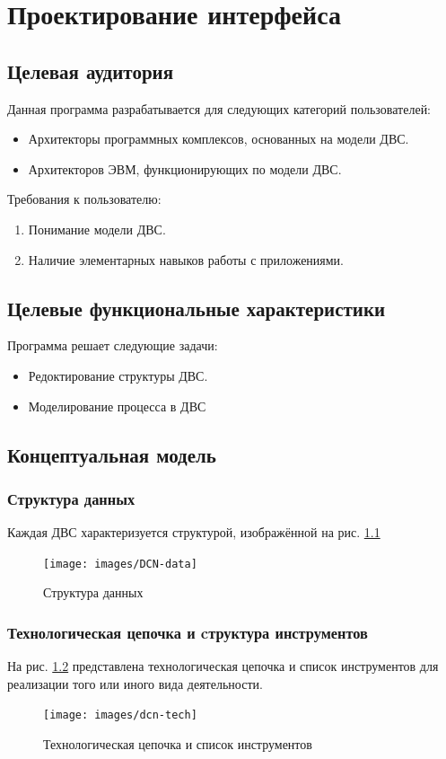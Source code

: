 \chapter{Проектирование интерфейса}
	\section{Целевая аудитория}
		Данная программа разрабатывается для следующих категорий пользователей:
		\begin{itemize}
			\item Архитекторы программных комплексов, основанных на модели ДВС.
			\item Архитекторов ЭВМ, функционирующих по модели ДВС.
		\end{itemize}
	
		\medskip

		Требования к пользователю:
		\begin{enumerate}
			\item Понимание модели ДВС.
			\item Наличие элементарных навыков работы с приложениями.
		\end{enumerate}
	
	\section{Целевые функциональные характеристики}
		Программа решает следующие задачи:
		\begin{itemize}
			\item Редоктирование структуры ДВС.
			\item Моделирование процесса в ДВС
		\end{itemize}
	
	\section{Концептуальная модель}
		\subsection{Структура данных}
			Каждая ДВС характеризуется структурой, изображённой на рис. \ref{fig:dcn-data}
			\begin{figure}[th]
				\centering
				\texttt{[image: images/DCN-data]}
				\caption{Структура данных}
				\label{fig:dcn-data}
			\end{figure}
		
		\subsection{Технологическая цепочка и cтруктура инструментов}
			На рис. \ref{fig:dcn-tech} представлена технологическая цепочка и список инструментов для реализации того или иного вида деятельности.
			\begin{figure}[th]
				\centering
				\texttt{[image: images/dcn-tech]}
				\caption{Технологическая цепочка и список инструментов}
				\label{fig:dcn-tech}
			\end{figure}
		

